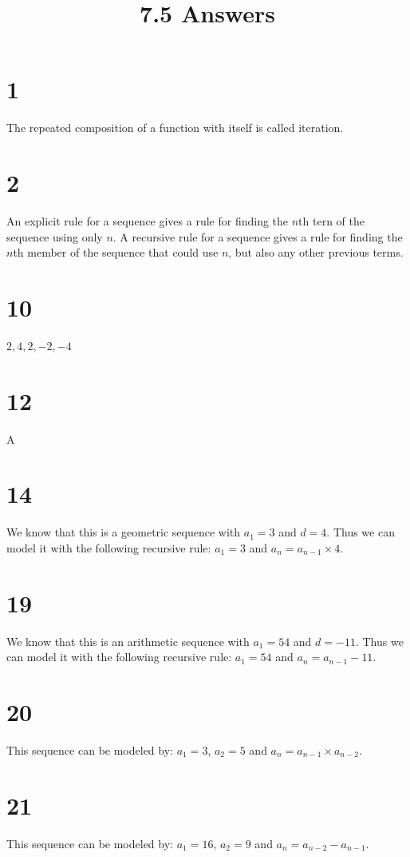 \documentclass{article}
\title{7.5 Answers}
\theoremstyle{definition}
\newcommand{\?}{\stackrel{?}{=}}
\begin{document}
\maketitle

\section*{1}
The repeated composition of a function with itself is called iteration.

\section*{2}
An explicit rule for a sequence gives a rule for finding the $n$th tern of the sequence using only $n$. A recursive rule for a sequence gives a rule 
for finding the $n$th member of the sequence that could use $n$, but also any other previous terms.

\section*{10}
$2,4,2,-2,-4$ 

\section*{12}
A

\section*{14}
We know that this is a geometric sequence with $a_1=3$ and $d=4$. Thus we can model it with the following recursive rule:
$a_1=3$ and $a_n=a_{n-1}\times 4$.

\section*{19}
We know that this is an arithmetic sequence with $a_1=54$ and $d=-11$. Thus we can model it with the following recursive rule:
$a_1=54$ and $a_n=a_{n-1}-11$.

\section*{20}
This sequence can be modeled by: $a_1=3$, $a_2=5$ and $a_n=a_{n-1}\times a_{n-2}$.

\section*{21}
This sequence can be modeled by: $a_1=16$, $a_2=9$ and $a_n=a_{n-2}-a_{n-1}$.
\end{document}
